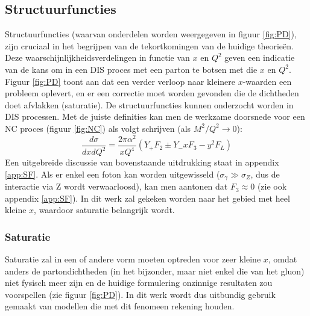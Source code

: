 \documentclass[a4paper,11pt]{article}
\numberwithin{equation}{section} %
\begin{document}
    \subsection{Structuurfuncties}
Structuurfuncties (waarvan onderdelen worden weergegeven in figuur \ref{fig:PD}), zijn cruciaal in het begrijpen van de tekortkomingen van de huidige theorieën.
Deze waarschijnlijkheidsverdelingen in functie van $x$ en $Q^2$  geven een indicatie van de kans om in een DIS proces met een parton te botsen met die $x$ en $Q^2$.
Figuur \ref{fig:PD} toont aan dat een verder verloop naar kleinere $x$-waarden een probleem oplevert, en er een correctie moet worden gevonden die de dichtheden doet afvlakken (saturatie).
De structuurfuncties kunnen onderzocht worden in DIS processen.
Met de juiste definities kan men de werkzame doorsnede voor een NC proces (figuur \ref{fig:NC}) als volgt schrijven (als $M^2/Q^2 \rightarrow 0$):
\begin{equation} \label{eq:SF}
\frac{d\sigma}{dxdQ^2} = \frac{2\pi \alpha^2}{xQ^4} \left(Y_+ F_2 \pm Y_- x F_3 - y^2 F_L \right)
\end{equation}
Een uitgebreide discussie van bovenstaande uitdrukking staat in appendix \ref{app:SF}.
Als er enkel een foton kan worden uitgewisseld ($\sigma_\gamma \gg \sigma_Z$, dus de interactie via Z wordt verwaarloosd), kan men aantonen dat $F_3 \approx 0$ (zie ook appendix \ref{app:SF}).
In dit werk zal gekeken worden naar het gebied met heel kleine $x$, waardoor saturatie belangrijk wordt.

    \subsubsection{Saturatie} \label{sec:Saturatie}
Saturatie zal in een of andere vorm moeten optreden voor zeer kleine $x$, omdat anders de partondichtheden (in het bijzonder, maar niet enkel die van het gluon) niet fysisch meer zijn en de huidige formulering onzinnige resultaten zou voorspellen (zie figuur \ref{fig:PD}).
In dit werk wordt dus uitbundig gebruik gemaakt van modellen die met dit fenomeen rekening houden.
\end{document}
